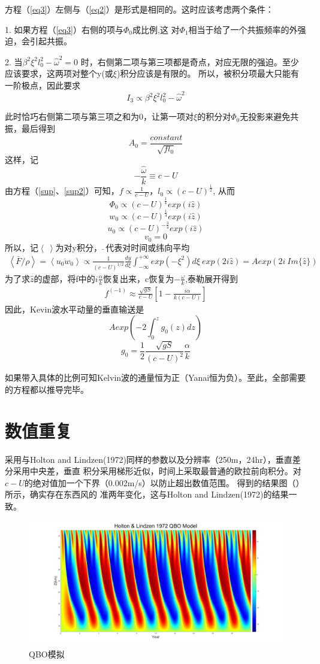 \documentclass[UTF8]{ctexart}
\begin{document}
	方程（\ref{eq3}）左侧与（\ref{eq2}）是形式是相同的。这时应该考虑两个条件：
	
	1. 如果方程（\ref{eq3}）右侧的项与$\Phi_0$成比例,这
	对$\Phi_1$相当于给了一个共振频率的外强迫，会引起共振。
	
	2. 当$\beta^2\xi^2l_0^2-{\widehat{\omega}}^2=0$
	时，右侧第二项与第三项都是奇点，对应无限的强迫。至少应该要求，这两项对整个y(或$\xi$)积分应该是有限的。
	所以，被积分项最大只能有一阶极点，因此要求
	\[I_3\propto\beta^2\xi^2l_0^2-{\widehat{\omega}}^2\]
	
	此时恰巧右侧第二项与第三项之和为0，让第一项对$\xi$的积分对$\Phi_0$无投影来避免共振，最后得到
	\[A_0=\frac{constant}{\sqrt{fl_0}}\]
	这样，记
	\[-\frac{\widehat{\omega}}{k}\equiv c-U\]
	由方程（\ref{sup}、\ref{sup2}）可知，$f\propto\frac{1}{c-U}$，$l_0\propto(c-U)^{\frac{1}{2}}$,
	从而
	\[\Phi_0\propto(c-U)^{\frac{1}{4}}exp(i\widehat{z})\]
	\[w_0\propto(c-U)^{\frac{1}{4}}exp(i\widehat{z})\]
	\[u_0\propto(c-U)^{-\frac{3}{4}}exp(i\widehat{z})\]
	\[v_0=0\]
	所以，记$\left\langle\ \right\rangle$为对y积分，$\bar{\ }\ $代表对时间或纬向平均
	\begin{align}\label{flux}
	\left\langle\bar{F}/\rho\right\rangle=\left\langle{\overline{u_0w_0}}\right\rangle\propto
	\frac{1}{(c-U)^{1/2}}\frac{dy}{d\xi}\int_{-\infty}^{+\infty}exp(-\xi^2)d\xi\ exp(2i\widehat{z})
	=Aexp(2i\ Im\{\widehat{z}\})
	\end{align}
	为了求$\widehat{z}$的虚部，将f中的$i\frac{\alpha}{k}$恢复出来，c恢复为$-\frac{\omega}{k}$,泰勒展开得到
	\begin{align}\label{f}
	f^{(-1)}\approx\frac{\sqrt{gS}}{c-U}[1-\frac{i\alpha}{k(c-U)}]
	\end{align}
	因此，Kevin波水平动量的垂直输送是
	\[Aexp(-2\int_{0}^{z}g_0(z)dz)\]
	\[ g_0=\frac{1}{2}\frac{\sqrt{gS}}{(c-U)^2}\frac{\alpha}{k}
	\]
	
	如果带入具体的比例可知Kelvin波的通量恒为正（Yanai恒为负）。至此，全部需要的方程都以推导完毕。
	\section{数值重复}
	采用与Holton and Lindzen(1972)\cite{main}同样的参数以及分辨率（250m，24hr），垂直差分采用中央差，垂直
	积分采用梯形近似，时间上采取最普通的欧拉前向积分。对$c-U$的绝对值加一个下界（0.002m/s）以防止超出数值范围。
	得到的结果图（）所示，确实存在东西风的
	准两年变化，这与Holton and Lindzen(1972)\cite{main}的结果一致。
	\begin{figure}[H]
		\centering
		\includegraphics[height =.3\textheight]{qbo.png}
		\caption{QBO模拟}
		\label{fig:delta18000}
	\end{figure}
	
\end{document}
